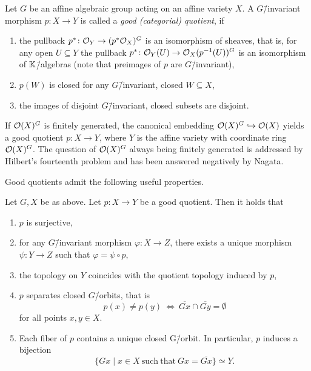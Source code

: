 \begin{defi}
	Let $G$ be an affine algebraic group acting on an affine variety $X$. A $G$\=/invariant morphism $p\colon X \rightarrow Y$ is called a \emph{good (categorial) quotient}, if
	\begin{enumerate}[label={\upshape(\roman*)}]
		\item the pullback $p^*\colon \mathcal{O}_Y \rightarrow (p^*\mathcal{O}_X)^G$ is an isomorphism of sheaves, that is, for any open $U\subseteq Y$ the pullback $p^*\colon \mathcal{O}_Y(U) \rightarrow \mathcal{O}_X(p^{-1}(U))^G$ is an isomorphism of $\mathbb{K}$\=/algebras (note that preimages of $p$ are $G$\=/invariant),
		\item $p(W)$ is closed for any $G$\=/invariant, closed $W\subseteq X$,
		\item the images of disjoint $G$\=/invariant, closed subsets are disjoint.
	\end{enumerate}
\end{defi}

If $\mathcal{O}(X)^G$ is finitely generated, the canonical embedding $\mathcal{O}(X)^G \hookrightarrow \mathcal{O}(X)$ yields a good quotient $p\colon X \rightarrow Y$, where $Y$ is the affine variety with coordinate ring $\mathcal{O}(X)^G$. The question of $\mathcal{O}(X)^G$ always being finitely generated is addressed by Hilbert's fourteenth problem and has been answered negatively by Nagata. \cite[chapter 4]{lectures_invariant_theory}

Good quotients admit the following useful properties.

\begin{prop}
	\label{prop:good_quotient_properties}
	Let $G, X$ be as above. Let $p\colon X \rightarrow Y$ be a good quotient. Then it holds that
	\begin{enumerate}[label={\upshape(\roman*)}]
		\item $p$ is surjective,
		\item for any $G$\=/invariant morphism $\varphi\colon X \rightarrow Z$, there exists a unique morphism $\psi\colon Y \rightarrow Z$ such that $\varphi = \psi \circ p$,
		\label{enum_item:good_quotient_universal_property}
		\item the topology on $Y$ coincides with the quotient topology induced by $p$,
		\item $p$ separates closed $G$\=/orbits, that is
		$$p(x) \neq p(y)\ \Leftrightarrow\ \overline{Gx}\cap\overline{Gy} = \emptyset$$
		for all points $x,y\in X$.
		\item Each fiber of $p$ contains a unique closed G\=/orbit. In particular, $p$ induces a bijection
		$$\{Gx\mid x\in X\ \mathrm{such}\ \mathrm{that}\ Gx = \overline{Gx}\}\simeq Y.$$
		\label{enum_item:good_quotient_space_bijection_closed_orbits}
	\end{enumerate}
\end{prop}


